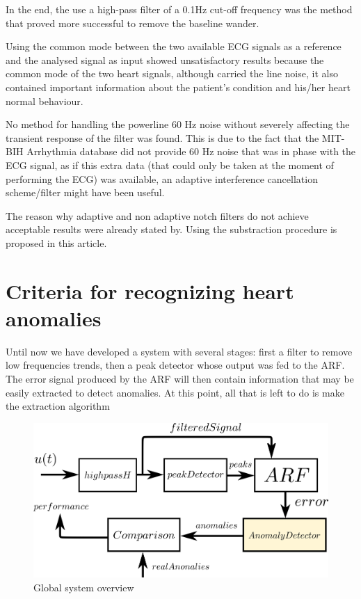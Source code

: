 \documentclass[conference]{IEEEtran}
\begin{document}
In the end, the use a high-pass filter of a 0.1Hz cut-off frequency was the method that proved more successful to remove the baseline wander.\par
Using the common mode between the two available ECG signals as a reference and the analysed signal as input showed unsatisfactory results because the common mode of the two heart signals, although carried the line noise, it also contained important information about the patient's condition and his/her heart normal behaviour.\par
No method for handling the powerline 60 Hz noise without severely affecting the transient response of the filter was found. This is due to the fact that the MIT-BIH Arrhythmia database did not provide 60 Hz noise that was in phase with the ECG signal, as if this extra data (that could only be taken at the moment of performing the ECG) was available, an adaptive interference cancellation scheme/filter might have been useful. \par
The reason why adaptive and non adaptive notch filters do not achieve acceptable results were already stated by. Using the substraction procedure is proposed in this article. \par


\section{Criteria for recognizing heart anomalies}
Until now we have developed a system with several stages: first a filter to remove low frequencies trends, then a peak detector whose output was fed to the ARF. The error signal produced by the ARF will then contain information that may be easily extracted to detect anomalies. At this point, all that is left to do is make the extraction algorithm\par
\begin{figure}[H]
\centerline{\includegraphics[scale=0.55]{imagenes/diagram}}
\caption{Global system overview}
\label{fig}
\end{figure}
\end{document}
